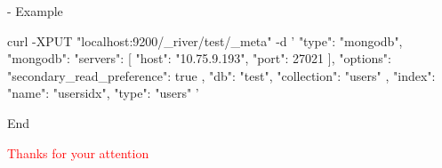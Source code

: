\documentclass[]{beamer}
\begin{document}
\begin{frame}[containsverbatim]{\subsecname{} - Example}
  \begin{command}
curl -XPUT "localhost:9200/_river/test/_meta" -d '
{
  "type": "mongodb",
  "mongodb": {
    "servers": [
      { "host": "10.75.9.193", "port": 27021 }
    ],
    "options": { "secondary_read_preference": true },
    "db": "test",
    "collection": "users"
  },
  "index": {
    "name": "usersidx",
    "type": "users"
  }
}'
  \end{command}
\end{frame}

\begin{frame}{End}
  \begin{center}
    \textcolor{red}{Thanks for your attention}
  \end{center}
\end{frame}
\end{document}
